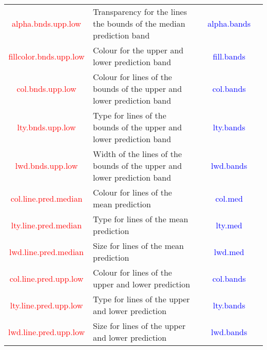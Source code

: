 \documentclass[11pt,a4paper]{report}
\begin{document}
\begin{table}[H]
\begin{center}
\begin{adjustbox}{max width=\textwidth}
\begin{tabularx}{\textwidth}[t]{|C p{7cm}  p{3cm}|C c|}
\textcolor{red}{ \ttfamily    alpha.bnds.upp.low} & Transparency for the lines the bounds of the median prediction band  & & \textcolor{blue}{\ttfamily alpha.bands}\\
\textcolor{red}{ \ttfamily    fillcolor.bnds.upp.low} & Colour for the upper and lower prediction band  & & \textcolor{blue}{\ttfamily fill.bands}\\
\textcolor{red}{ \ttfamily    col.bnds.upp.low} & Colour for lines of the bounds of the upper and lower  prediction band & & \textcolor{blue}{\ttfamily col.bands}\\
\textcolor{red}{ \ttfamily    lty.bnds.upp.low} & Type for lines of the bounds of the upper and lower  prediction band & & \textcolor{blue}{\ttfamily lty.bands}\\
\textcolor{red}{ \ttfamily    lwd.bnds.upp.low} & Width of the lines of the bounds of the upper and lower  prediction band & & \textcolor{blue}{\ttfamily lwd.bands}\\
\textcolor{red}{ \ttfamily    col.line.pred.median} & Colour for lines of the mean prediction  & & \textcolor{blue}{\ttfamily col.med} \\
\textcolor{red}{ \ttfamily    lty.line.pred.median} &  Type for lines of the mean prediction& & \textcolor{blue}{\ttfamily lty.med} \\
\textcolor{red}{ \ttfamily    lwd.line.pred.median} &  Size  for lines of the mean prediction& & \textcolor{blue}{\ttfamily lwd.med} \\
\textcolor{red}{ \ttfamily    col.line.pred.upp.low} &  Colour for lines of the upper and lower prediction& & \textcolor{blue}{\ttfamily col.bands} \\
\textcolor{red}{ \ttfamily    lty.line.pred.upp.low} &  Type for lines of the upper and lower prediction& & \textcolor{blue}{\ttfamily lty.bands} \\
\textcolor{red}{ \ttfamily    lwd.line.pred.upp.low} &  Size for lines of the upper and lower prediction& & \textcolor{blue}{\ttfamily lwd.bands} \\
\hline
\end{tabularx} 
\end{adjustbox}

\end{center}
\end{table} 
\end{document}

